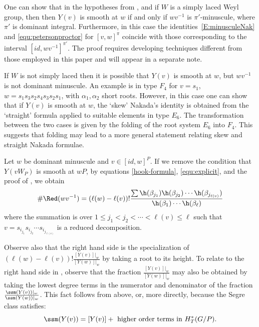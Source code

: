 \begin{remark}\label{rem:reducetoid} One can show that in the hypotheses
	from , and if $W$ is a simply laced Weyl group, then 
	then $Y(v)$ is smooth at $w$ if and only if $wv^{-1}$ is $\pi'$-minuscule, 
	where $\pi'$ is dominant integral. Furthermore, in this case the identities~\eqref{E:minusculeNak} and \eqref{equ:petersonproctor}
	for $[v,w]^\pi$ coincide with those corresponding to the interval $[id,wv^{-1}]^{\pi'}$.
	The proof requires developing techniques different from those employed in 
		this paper and will appear in a separate note.
	
	If $W$ is not simply laced then it is possible that $Y(v)$ is smooth at $w$, but $wv^{-1}$ is not dominant minuscule. An 
	example is in type $F_4$ for $v=s_1$, $w=s_1 s_3 s_2s_4s_3s_2s_1$, with $\alpha_1, \alpha_2$ short roots. However, in this case one can 
	show that if $Y(v)$ is smooth at $w$,
	the `skew' Nakada's identity is obtained from the `straight' formula applied to suitable elements 
	in type $E_6$. The transformation between the two cases is given by the folding of the root system
	$E_6$ into $F_4$. This suggests that folding may lead to a more general statement relating skew and straight Nakada formulae. 
\end{remark}



\begin{remark}\label{rem:general_miuscule} Let $w$ be dominant minuscule and 
		$v\in [id,w]^P$. If we remove the condition that $Y(vW_P)$ is smooth at $wP$, by equations \eqref{hook-formula}, \eqref{equ:explicit}, and the proof of , 
	we obtain
	\begin{equation}\label{skew:cohomology}
		\# \Red(wv^{-1})=(\ell(w)-\ell(v))!\frac{\sum \h(\beta_{j_1})\h(\beta_{j_2})\cdots \h(\beta_{j_{\ell(v)}})}{\h(\beta_1)\cdots \h(\beta_\ell)}
	\end{equation}
	where the summation is over $ 1\leq j_1<j_2<\cdots <\ell(v)\leq \ell$ such that 
	$v= s_{i_{j_1}}s_{i_{j_2}}\cdots s_{i_{j_{\ell(v)}}}$ is a reduced decomposition. 
	
	Observe also that the right hand side is the specialization of
	$(\ell(w)-\ell(v))!\frac{[Y(v)]|_w}{[Y(w)]|_w}$ 
	by taking a root to its height.
	To relate to the right hand side in , observe that 
		the fraction $\frac{[Y(v)]|_w}{[Y(w)]|_w}$
		may also be obtained by taking the lowest degree terms in the numerator and denominator of
		the fraction $\frac{\ssm(Y(v))|_w}{\ssm(Y(w))|_w}$.
		This fact follows from  above, or, more directly, 
		because the Segre class satisfies: 
		\[ \ssm(Y(v)) = [Y(v)] + \textrm{ higher order terms in $H^*_T(G/P)$} \/.\]
\end{remark}

